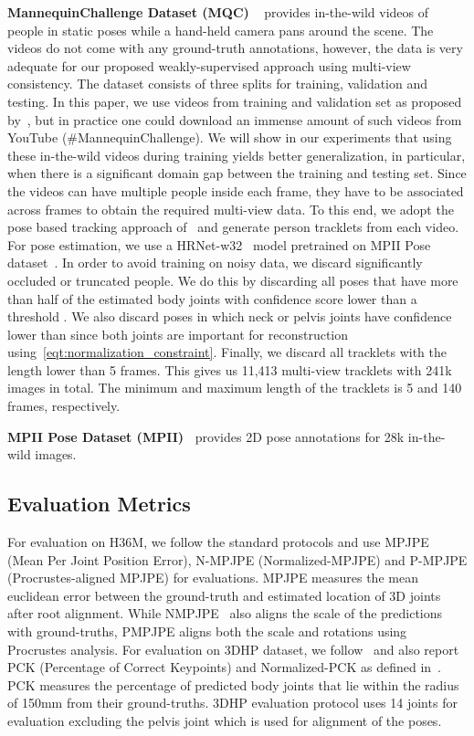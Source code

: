 \noindent\textbf{MannequinChallenge Dataset (MQC) }~\cite{li2019mannequin} provides in-the-wild videos of people in static poses while a hand-held camera pans around the scene. The videos do not come with any ground-truth annotations, however, the data is very adequate for our proposed weakly-supervised approach using multi-view consistency. The dataset consists of three splits for training, validation and testing. In this paper, we use  videos from training and validation set as proposed by~\cite{li2019mannequin}, but in practice one could download an immense amount of such videos from YouTube (\#MannequinChallenge). We will show in our experiments that using these in-the-wild videos during training yields better generalization,
in particular, when there is a significant domain gap between the training and testing set. Since the videos can have multiple people inside each frame, they have to be associated across frames to obtain the required multi-view data. To this end, we adopt the pose based tracking approach of~\cite{FlowTrack} and generate person tracklets from each video. For pose estimation, we use a HRNet-w32~\cite{SunXLW19} model pretrained on MPII Pose dataset~\cite{andriluka14cvpr}. In order to avoid training on noisy data, we discard significantly occluded or truncated people. We do this by  discarding all poses that have more than half of the estimated body joints with confidence score lower than a threshold . We also discard poses in which neck or pelvis joints have confidence lower than  since both joints are important for  reconstruction using~\eqref{eqt:normalization_constraint}. Finally, we discard all tracklets with the length lower than 5 frames. This gives us 11,413 multi-view tracklets with 241k images in total. The minimum and maximum length of the tracklets is 5 and 140 frames, respectively. 

\noindent\textbf{MPII Pose Dataset (MPII)~\cite{andriluka14cvpr}} provides 2D pose annotations for 28k in-the-wild images. 

\subsection{Evaluation Metrics}
For evaluation on H36M, we follow the standard protocols and use MPJPE (Mean Per Joint Position Error), N-MPJPE (Normalized-MPJPE) and  P-MPJPE (Procrustes-aligned MPJPE) for evaluations. MPJPE measures the mean euclidean error between the ground-truth and estimated location of 3D joints after root alignment. While NMPJPE~\cite{rohdin2018multiview} also aligns the scale of the predictions with ground-truths, PMPJPE aligns both the scale and rotations using Procrustes analysis. For evaluation on 3DHP dataset, we follow~\cite{mono20173dhp} and also report PCK (Percentage of Correct
Keypoints) and Normalized-PCK as defined in~\cite{rohdin2018multiview}. PCK measures the percentage of predicted body joints that lie within the radius of 150mm from their ground-truths. 3DHP evaluation protocol uses 14 joints for evaluation excluding the pelvis joint which is used for alignment of the poses.  

